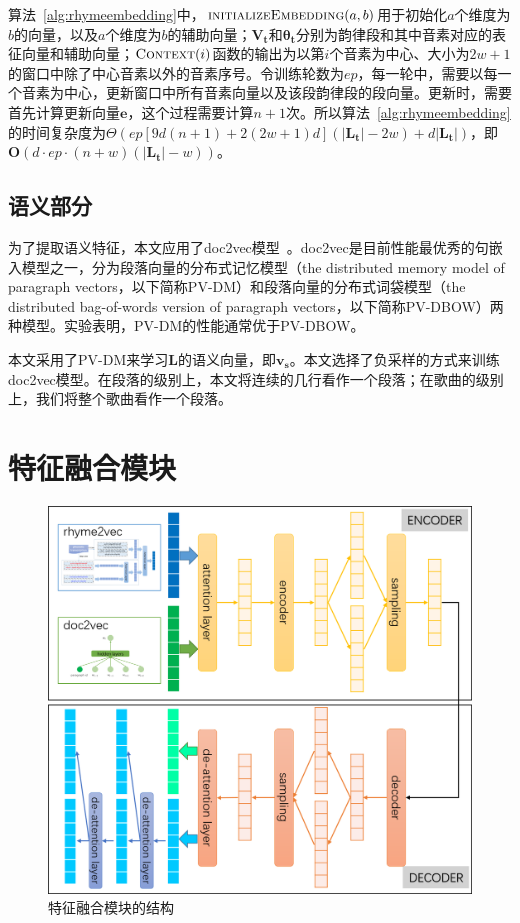 算法~\ref{alg:rhymeembedding}中，$\Call{initializeEmbedding}{a, b}$用于初始化$a$个维度为$b$的向量，以及$a$个维度为$b$的辅助向量；$\bm {V_t}$和$\bm {\theta_t}$分别为韵律段和其中音素对应的表征向量和辅助向量；$\Call{Context}{i}$函数的输出为以第$i$个音素为中心、大小为$2w+1$的窗口中除了中心音素以外的音素序号。令训练轮数为$ep$，每一轮中，需要以每一个音素为中心，更新窗口中所有音素向量以及该段韵律段的段向量。更新时，需要首先计算更新向量$\bm e$，这个过程需要计算$n+1$次。所以算法~\ref{alg:rhymeembedding}的时间复杂度为$\Theta({ep[9d(n + 1) + 2(2w + 1)d](|\bm {L_t}|-2w)}+d|\bm {L_t}|)$，即$\mathrm{\bm O}(d\cdot ep \cdot(n+w)(|\bm {L_t}|-w))$。

\subsection{语义部分}

为了提取语义特征，本文应用了doc2vec模型~\autocite{quoc2014distributed}。doc2vec是目前性能最优秀的句嵌入模型之一，分为段落向量的分布式记忆模型（the distributed memory model of paragraph vectors，以下简称PV-DM）和段落向量的分布式词袋模型（the distributed bag-of-words version of paragraph vectors，以下简称PV-DBOW）两种模型。实验表明，PV-DM的性能通常优于PV-DBOW。\par

本文采用了PV-DM来学习$\bm {L}$的语义向量，即$\bm {v_s}$。本文选择了负采样的方式来训练doc2vec模型。在段落的级别上，本文将连续的几行看作一个段落；在歌曲的级别上，我们将整个歌曲看作一个段落。\par

\section{特征融合模块} \label{utm}

\begin{figure}[t]
  \centering
  \includegraphics[width=1\textwidth]{HAVAE.png}
  \caption{特征融合模块的结构}
  \label{fig:aggregation}
\end{figure}

